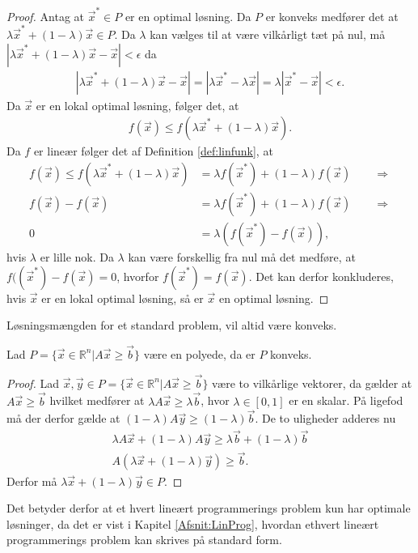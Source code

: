 \begin{proof}
Antag at $\vec{x}^* \in P$ er en optimal løsning.
Da $P$ er konveks medfører det at $\lambda \vec{x}^* + (1-\lambda)\vec{x} \in P$. 
Da $\lambda$ kan vælges til at være vilkårligt tæt på nul, må $|\lambda \vec{x}^* + (1-\lambda)\vec{x} - \vec{x}| < \epsilon$ da
\begin{align*}
 |\lambda \vec{x}^* + (1-\lambda)\vec{x} - \vec{x}| = | \lambda \vec{x}^* - \lambda\vec{x}| = \lambda|\vec{x}^* - \vec{x}| < \epsilon.
\end{align*}
Da $\vec{x}$ er en lokal optimal løsning, følger det, at
\begin{align*}
f(\vec{x}) \leq f(\lambda \vec{x}^* + (1-\lambda)\vec{x}).
\end{align*}
Da $f$ er lineær følger det af Definition \ref{def:linfunk}, at 
\begin{align*}
f(\vec{x}) \leq f(\lambda \vec{x}^* + (1-\lambda)\vec{x}) &= \lambda f(\vec{x}^*) + (1-\lambda)f(\vec{x}) \qquad \Rightarrow
\\ f(\vec{x}) - f(\vec{x}) &=\lambda f(\vec{x}^*) + (1-\lambda)f(\vec{x}) \qquad \Rightarrow
\\ 0 & = \lambda( f(\vec{x}^*) - f(\vec{x})),
\end{align*}
hvis $\lambda$ er lille nok.
Da $ \lambda$ kan være forskellig fra nul må det medføre, at $f((\vec{x}^*) - f(\vec{x}) = 0$, hvorfor $f(\vec{x}^*) =f(\vec{x})$. 
Det kan derfor konkluderes, hvis $\vec{x}$ er en lokal optimal løsning, så er $\vec{x}$ en optimal løsning.
\end{proof}
Løsningsmængden  for et standard problem, vil altid være konveks.
\begin{stn}
Lad $P =\{ \vec{x} \in \mathds{R}^n | A \vec{x} \geq \vec{b}\} $ være en polyede, da er $P$ konveks.
\label{stn:polykon}
\end{stn}
\begin{proof}
Lad $\vec{x}, \vec{y} \in P=\{ \vec{x} \in \mathds{R}^n | A \vec{x} \geq \vec{b}\}$ være to vilkårlige vektorer, da gælder at $A\vec{x} \geq \vec{b}$ hvilket medfører at $\lambda A \vec{x} \geq \lambda\vec{b}$, hvor $\lambda \in [0,1]$ er en skalar. 
På ligefod må der derfor gælde at $(1-\lambda)A\vec{y} \geq (1-\lambda)\vec{b}$.
De to uligheder adderes nu
\begin{align*}
\lambda A \vec{x} + (1-\lambda) A \vec{y} \geq \lambda \vec{b} + (1 - \lambda) \vec{b}
\\  A (\lambda\vec{x} + (1-\lambda)\vec{y}) \geq \vec{b}.
\end{align*}
Derfor må $\lambda\vec{x} + (1-\lambda)\vec{y} \in P$.
\end{proof}
Det betyder derfor at et hvert lineært programmerings problem kun har optimale løsninger, da det er vist i Kapitel \ref{Afsnit:LinProg}, hvordan ethvert lineært programmerings problem kan skrives på standard form.



